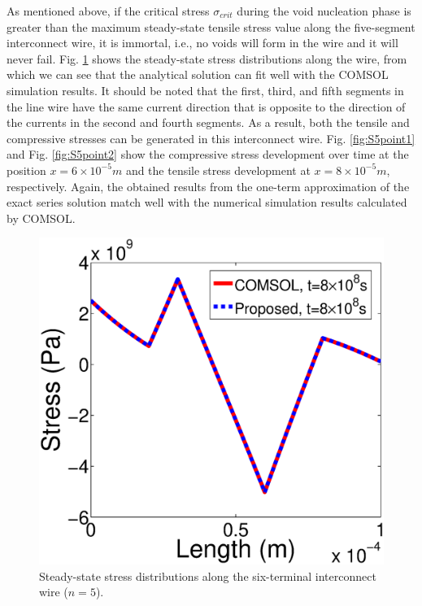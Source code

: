 As mentioned above, if the critical stress $\sigma_{crit}$ during the void nucleation phase is greater than the maximum steady-state tensile stress value along the five-segment interconnect wire, it is immortal, i.e., no voids will form in the wire and it will never fail. Fig. \ref{fig:S5StableT0} shows the steady-state stress distributions along the wire, from which we can see that the analytical solution can fit well with the COMSOL simulation results. It should be noted that the first, third, and fifth segments in the line wire have the same current direction that is opposite to the direction of the currents in the second and fourth segments. As a result, both the tensile and compressive stresses can be generated in this interconnect wire. Fig. \ref{fig:S5point1} and Fig. \ref{fig:S5point2} show the compressive stress development over time at the position $x=6\times 10^{-5}m$ and the tensile stress development at $x=8\times 10^{-5}m$, respectively. Again, the obtained results from the one-term approximation of the exact series solution match well with the numerical simulation results calculated by COMSOL.

\begin{figure}[!h]
\centering
\includegraphics[width=0.7\columnwidth]{S5StableT0.eps}
\caption{Steady-state stress distributions along the six-terminal interconnect wire ($n=5$).}
\label{fig:S5StableT0}
\end{figure}

